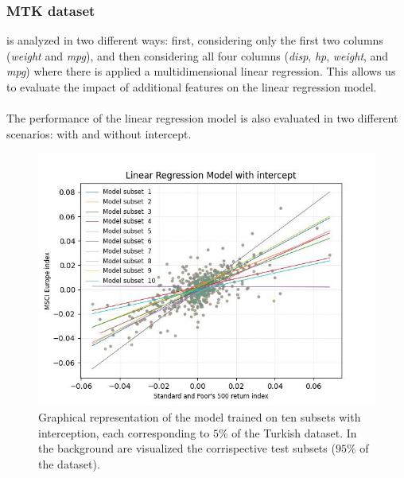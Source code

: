 \documentclass[9pt,technote]{IEEEtran}
\begin{document}
		\subsubsection{MTK dataset}
		 is analyzed in two different ways: first, considering only the first two columns (\textit{weight} and \textit{mpg}), and then considering all four columns (\textit{disp}, \textit{hp}, \textit{weight}, and \textit{mpg}) where there is applied a multidimensional linear regression. This allows us to evaluate the impact of additional features on the linear regression model.\\\\
		The performance of the linear regression model is also evaluated in two different scenarios: with and without intercept.
			
		\begin{figure}
			\centering
  			\includegraphics[width=1\linewidth]{figures/turkish_with_intercept.jpg}
  			\caption{Graphical representation of the model trained on ten subsets with interception, each corresponding to $5\%$ of the Turkish dataset. In the background are visualized the corrispective test subsets ($95\%$ of the dataset).}
  			\label{fig::turkish_with_intercept}
		\end{figure}
\end{document}
